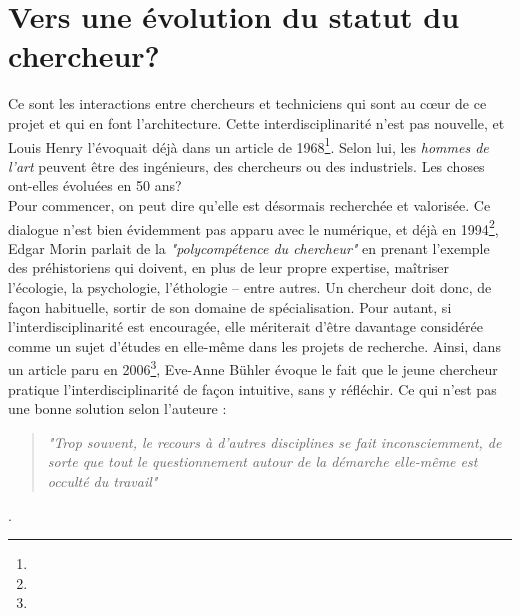     \section{Vers une évolution du statut du chercheur?}

Ce sont les interactions entre chercheurs et techniciens qui sont au cœur de ce projet et qui en font l’architecture. Cette interdisciplinarité n'est pas nouvelle, et Louis Henry l'évoquait déjà dans un article de 1968\footnote{}. Selon lui, les \textit{hommes de l'art} peuvent être des ingénieurs, des chercheurs ou des industriels. Les choses ont-elles évoluées en 50 ans? \\
Pour commencer, on peut dire qu'elle est désormais recherchée et valorisée. Ce dialogue n'est bien évidemment pas apparu avec le numérique, et déjà en 1994\footnote{}, Edgar Morin parlait de la \textit{"polycompétence du chercheur"} en prenant l’exemple des préhistoriens qui doivent, en plus de leur propre expertise, maîtriser l’écologie, la psychologie, l’éthologie – entre autres. Un chercheur doit donc, de façon habituelle, sortir de son domaine de spécialisation. Pour autant, si l'interdisciplinarité est encouragée, elle mériterait d'être davantage considérée comme un sujet d'études en elle-même dans les projets de recherche. Ainsi, dans un article paru en 2006\footnote{}, Eve-Anne Bühler  évoque le fait que le jeune chercheur pratique l’interdisciplinarité de façon intuitive, sans y réfléchir. Ce qui n’est pas une bonne solution selon l’auteure : 

\begin{quote}
    \textit{"Trop souvent, le recours à d’autres disciplines se fait inconsciemment, de sorte que tout le questionnement autour de la démarche elle-même est occulté du travail"}
\end{quote}. 

